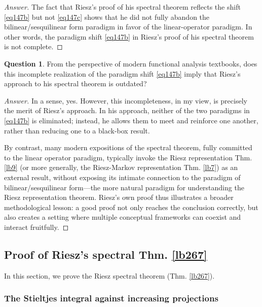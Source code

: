 \documentclass[12pt,b5paper,notitlepage]{article}
\theoremstyle{definition}
\newtheorem{question}[df]{Question}
\theoremstyle{plain}
\numberwithin{equation}{section}
\begin{document}
\begin{proof}[Answer]
The fact that Riesz's proof of his spectral theorem reflects the shift \eqref{eq147b} but not \eqref{eq147c} shows that he did not fully abandon the bilinear/sesquilinear form paradigm in favor of the linear-operator paradigm. In other words, the paradigm shift \eqref{eq147b} in Riesz's proof of his spectral theorem is not complete.
\end{proof}


\begin{question}
From the perspective of modern functional analysis textbooks, does this incomplete realization of the paradigm shift \eqref{eq147b} imply that Riesz's approach to his spectral theorem is outdated?
\end{question}


\begin{proof}[Answer]
In a sense, yes. However, this incompleteness, in my view, is precisely the merit of Riesz's approach. In his approach, neither of the two paradigms in \eqref{eq147b} is eliminated; instead, he allows them to meet and reinforce one another, rather than reducing one to a black-box result.

By contrast, many modern expositions of the spectral theorem, fully committed to the linear operator paradigm, typically invoke the Riesz representation Thm. \ref{lb9} (or more generally, the Riesz-Markov representation Thm. \ref{lb7}) as an external result, without exposing its intimate connection to the paradigm of bilinear/sesquilinear form---the more natural paradigm for understanding the Riesz representation theorem. Riesz's own proof thus illustrates a broader methodological lesson: a good proof not only reaches the conclusion correctly, but also creates a setting where multiple conceptual frameworks can coexist and interact fruitfully.
\end{proof}





\subsection{Proof of Riesz's spectral Thm. \ref{lb267}}\label{lb278}


In this section, we prove the Riesz spectral theorem (Thm. \ref{lb267}).


\subsubsection{The Stieltjes integral against increasing projections}\label{lb288}
\end{document}
